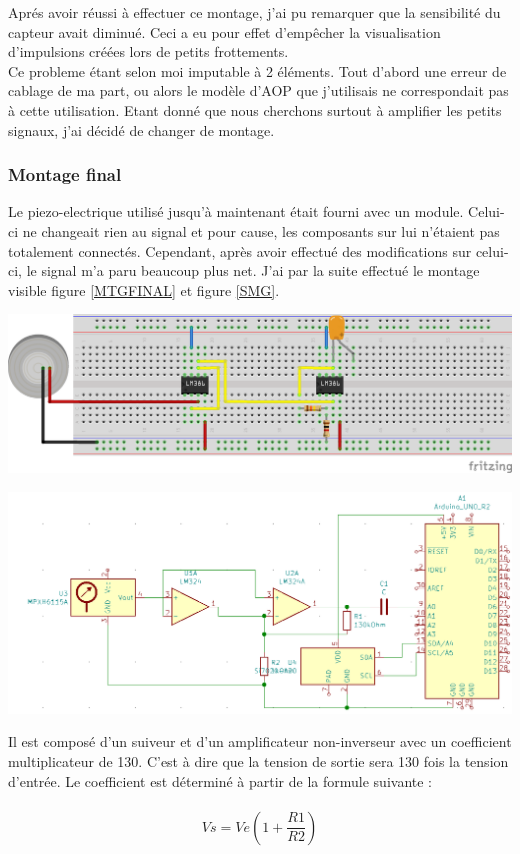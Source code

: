 \documentclass[12pt,french,a4paper]{article}
\begin{document}
Aprés avoir réussi à effectuer ce montage, j’ai pu remarquer que la sensibilité du capteur avait diminué. Ceci a eu pour effet d’empêcher la visualisation d’impulsions créées lors de petits frottements.\\ Ce probleme étant selon moi imputable à 2 éléments. Tout d'abord une erreur de cablage de ma part, ou alors le modèle d'AOP que j'utilisais ne correspondait pas à cette utilisation. Etant donné que nous cherchons surtout à amplifier les petits signaux, j’ai décidé de changer de montage.

\subsubsection{Montage final}
Le piezo-electrique utilisé jusqu’à maintenant était fourni avec un module. Celui-ci ne changeait rien au signal et pour cause, les composants sur lui n’étaient pas totalement connectés. Cependant, après avoir effectué des modifications sur celui-ci, le signal m'a paru beaucoup plus net.
J’ai par la suite effectué le montage visible figure \ref{MTGFINAL} et figure \ref{SMG}.
\\
\begin{center}	
\includegraphics[scale=0.85]{../img/mtgfinal.png}
\label{MTGFINAL}
\end{center}

\begin{center}
    \includegraphics[scale=0.5]{../img/SMG.png}
    \label{SMG}
\end{center}
Il est composé d’un suiveur et d’un amplificateur non-inverseur avec un coefficient multiplicateur de 130. C'est à dire que la tension de sortie sera 130 fois la tension d'entrée. Le coefficient est déterminé à partir de la formule suivante : \\ \\
\[
	Vs = Ve (1 + \frac{R1}{R2})
\]
\end{document}
